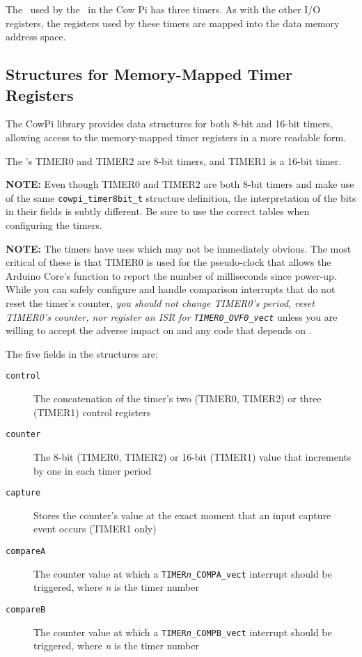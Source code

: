 The \microcontroller\ used by the \mcuboard\ in the Cow Pi has three timers.
As with the other I/O registers, the registers used by these timers are mapped into the data memory address space.

\subsection{Structures for Memory-Mapped Timer Registers}

The CowPi library provides data structures for both 8-bit and 16-bit timers, allowing access to the memory-mapped timer registers in a more readable form.



The \microcontroller's TIMER0 and TIMER2 are 8-bit timers, and TIMER1 is a 16-bit timer.

\textbf{NOTE:} Even though TIMER0 and TIMER2 are both 8-bit timers and make use of the same \lstinline{cowpi_timer8bit_t} structure definition, the interpretation of the bits in their fields is subtly different.
Be sure to use the correct tables when configuring the timers.

\textbf{NOTE:} The timers have uses which may not be immediately obvious.
The most critical of these is that TIMER0 is used for the pseudo-clock that allows the Arduino Core's  function to report the number of milliseconds since power-up.
While you can safely configure and handle comparison interrupts that do not reset the timer's counter, \textit{you should not change TIMER0's period, reset TIMER0's counter, nor register an ISR for \lstinline{TIMER0_OVF0_vect}} unless you are willing to accept the adverse impact on  and any code that depends on .

The five fields in the structures are:

\begin{description}
    \item[\texttt{control}] The concatenation of the timer's two (TIMER0, TIMER2) or three (TIMER1) control registers
    \item[\texttt{counter}] The 8-bit (TIMER0, TIMER2) or 16-bit (TIMER1) value that increments by one in each timer period
    \item[\texttt{capture}] Stores the counter's value at the exact moment that an input capture event occurs (TIMER1 only)
    \item[\texttt{compareA}] The counter value at which a \texttt{TIMER\textit{n}\_COMPA\_vect} interrupt should be triggered, where \textit{n} is the timer number
    \item[\texttt{compareB}] The counter value at which a \texttt{TIMER\textit{n}\_COMPB\_vect} interrupt should be triggered, where \textit{n} is the timer number
\end{description}

